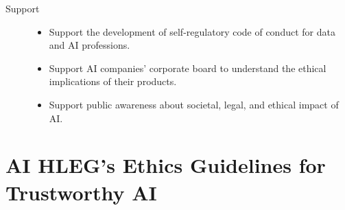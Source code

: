 \begin{description}
    \item[Support] \phantom{}
        \begin{itemize}
            \item Support the development of self-regulatory code of conduct for data and AI professions.
            \item Support AI companies' corporate board to understand the ethical implications of their products.
            \item Support public awareness about societal, legal, and ethical impact of AI.
        \end{itemize}
\end{description}



\section{AI HLEG's Ethics Guidelines for Trustworthy AI}

